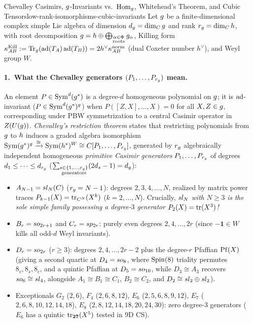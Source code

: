 \label{subsec:lie-whitehead}
\begin{zkmodule}{Chevalley Casimirs, $g$-Invariants vs.\ $\operatorname{Hom}_{g}$, Whitehead's Theorem, and Cubic Tensors}{low-rank-isomorphisms-cubic-invariants}
Let $g$ be a finite-dimensional complex simple Lie algebra of dimension $d_{g} = \dim_{C}g$ and rank $r_{g} = \dim_{C}h$, with root decomposition $g = h \oplus \bigoplus_{\substack{\alpha\in\Phi\\\mathrm{roots}}}g_\alpha$, Killing form $\kappa^{\mathrm{Kill}}_{AB} := \operatorname{Tr}_{g}(\operatorname{ad}(T_A)\operatorname{ad}(T_B)) = 2h^\vee\kappa^{\mathrm{norm}}_{AB}$ (dual Coxeter number $h^\vee$), and Weyl group $W$.

\paragraph{1.\ What the Chevalley generators $(P_1,\dots,P_{r_{g}})$ mean.}
An element $P \in \operatorname{Sym}^d(g^*)$ is a degree-$d$ homogeneous polynomial on $g$; it is $\operatorname{ad}$-invariant ($P \in \operatorname{Sym}^d(g^*)^{g}$) when $P([Z,X],\dots,X) = 0$ for all $X,Z \in g$, corresponding under PBW symmetrization to a central Casimir operator in $Z(U(g))$. \emph{Chevalley's restriction theorem} states that restricting polynomials from $g$ to $h$ induces a graded algebra isomorphism $\operatorname{Sym}(g^*)^{g} \xrightarrow{\cong} \operatorname{Sym}(h^*)^W \cong C[P_1,\dots,P_{r_{g}}]$, generated by $r_{g}$ algebraically independent homogeneous \emph{primitive Casimir generators} $P_1,\dots,P_{r_{g}}$ of degrees $d_1 \le \dots \le d_{r_{g}}$ ($\sum_{\substack{s\in\{1,\dots,r_{g}\}\\\mathrm{generators}}}(2d_s - 1) = d_{g}$):
\begin{itemize}[leftmargin=*]
  \item $A_{N-1} = sl_N(C)$ ($r_{g} = N-1$): degrees $2, 3, 4, \dots, N$, realized by matrix power traces $P_{k-1}(X) = \operatorname{tr}_{C^N}(X^k)$ ($k=2,\dots,N$). Crucially, \emph{$sl_N$ with $N \ge 3$ is the sole simple family possessing a degree-$3$ generator $P_2(X) = \operatorname{tr}(X^3)$!}
  \item $B_r = so_{2r+1}$ and $C_r = sp_{2r}$: purely even degrees $2, 4, \dots, 2r$ (since $-\mathbf{1} \in W$ kills all odd-$d$ Weyl invariants).
  \item $D_r = so_{2r}$ ($r \ge 3$): degrees $2, 4, \dots, 2r-2$ plus the degree-$r$ Pfaffian $\operatorname{Pf}(X)$ (giving a second quartic at $D_4 = so_8$, where $\operatorname{Spin}(8)$ triality permutes $8_v, 8_s, 8_c$, and a quintic Pfaffian at $D_5 = so_{10}$, while $D_3 \cong A_3$ recovers $so_6 \cong sl_4$, alongside $A_1 \cong B_1 \cong C_1$, $B_2 \cong C_2$, and $D_2 \cong sl_2\oplus sl_2$).
  \item Exceptionals $G_2$ ($2,6$), $F_4$ ($2,6,8,12$), $E_6$ ($2,5,6,8,9,12$), $E_7$ ($2,6,8,10,12,14,18$), $E_8$ ($2,8,12,14,18,20,24,30$): zero degree-$3$ generators ($E_6$ has a quintic $\operatorname{tr}_{\mathbf{27}}(X^5)$ tested in $9\mathrm{D}$ CS).
\end{itemize}


\end{zkmodule}
